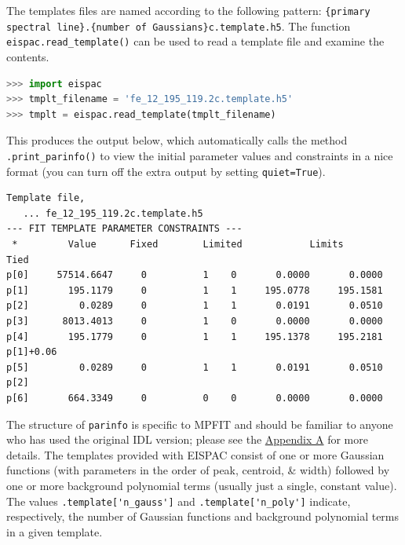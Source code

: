 The templates files are named according to the following pattern: \verb+{primary spectral line}.{number of Gaussians}c.template.h5+. The function \verb+eispac.read_template()+ can be used to read a template file and examine the contents.

\begin{lstlisting}[language=Python]
>>> import eispac
>>> tmplt_filename = 'fe_12_195_119.2c.template.h5'
>>> tmplt = eispac.read_template(tmplt_filename)
\end{lstlisting}

This produces the output below, which automatically calls the method \verb+.print_parinfo()+ to view the initial parameter values and constraints in a nice format (you can turn off the extra output by setting \verb+quiet=True+).

\begin{lstlisting}
Template file,
   ... fe_12_195_119.2c.template.h5
--- FIT TEMPLATE PARAMETER CONSTRAINTS ---
 *         Value      Fixed        Limited            Limits               Tied
p[0]     57514.6647     0          1    0       0.0000       0.0000
p[1]       195.1179     0          1    1     195.0778     195.1581
p[2]         0.0289     0          1    1       0.0191       0.0510
p[3]      8013.4013     0          1    0       0.0000       0.0000
p[4]       195.1779     0          1    1     195.1378     195.2181          p[1]+0.06
p[5]         0.0289     0          1    1       0.0191       0.0510          p[2]
p[6]       664.3349     0          0    0       0.0000       0.0000
\end{lstlisting}

The structure of \verb+parinfo+ is specific to MPFIT and should be familiar to 
anyone who has used the original IDL version; please see the 
\hyperref[sec:parinfo]{Appendix A} for more details. The templates provided with EISPAC 
consist of one or more Gaussian functions (with parameters in the order of peak,
centroid, \& width) followed by one or more background polynomial terms (usually
just a single, constant value). The values \verb+.template['n_gauss']+ and 
\verb+.template['n_poly']+ indicate, respectively, the number of Gaussian 
functions and background polynomial terms in a given template.

